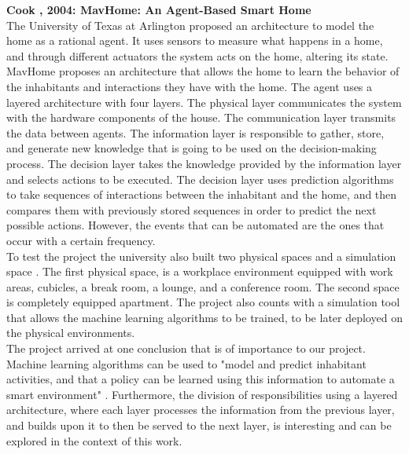 \textbf{Cook \etAl, 2004: MavHome: An Agent-Based Smart Home} \cite{1192783} \\
The University of Texas at Arlington proposed an architecture to model the home as a rational agent. It uses sensors to measure what happens in a home, and through different actuators the system acts on the home, altering its state. MavHome proposes an architecture that allows the home to learn the behavior of the inhabitants and interactions they have with the home. The agent uses a layered architecture \cite{1192783} with four layers. The physical layer communicates the system with the hardware components of the house. The communication layer transmits the data between agents. The information layer is responsible to gather, store, and generate new knowledge that is going to be used on the decision-making process. The decision layer takes the knowledge provided by the information layer and selects actions to be executed. The decision layer uses prediction algorithms to take sequences of interactions between the inhabitant and the home, and then compares them with previously stored sequences in order to predict the next possible actions. However, the events that can be automated are the ones that occur with a certain frequency. \\
To test the project the university also built two physical spaces and a simulation space \cite{inhabitantguidanceofsmartenvironments}. The first physical space, is a workplace environment equipped with work areas, cubicles, a break room, a lounge, and a conference room. The second space is completely equipped apartment. The project also counts with a simulation tool that allows the machine learning algorithms to be trained, to be later deployed on the physical environments.\\ 
The project arrived at one conclusion that is of importance to our project. Machine learning algorithms can be used to "model and predict inhabitant activities, and that a policy can be learned using this information to automate a smart environment" \cite{inhabitantguidanceofsmartenvironments}. Furthermore, the division of responsibilities using a layered architecture, where each layer processes the information from the previous layer, and builds upon it to then be served to the next layer, is interesting and can be explored in the context of this work.\\

